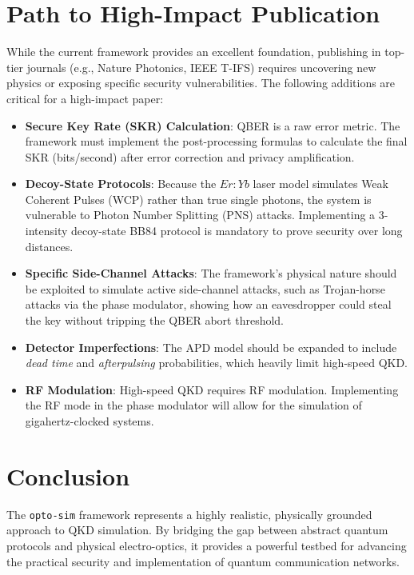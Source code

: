 \documentclass[12pt,a4paper]{article}
\begin{document}
\section{Path to High-Impact Publication}
While the current framework provides an excellent foundation, publishing in top-tier journals (e.g., Nature Photonics, IEEE T-IFS) requires uncovering new physics or exposing specific security vulnerabilities. The following additions are critical for a high-impact paper:
\begin{itemize}
    \item \textbf{Secure Key Rate (SKR) Calculation}: QBER is a raw error metric. The framework must implement the post-processing formulas to calculate the final SKR (bits/second) after error correction and privacy amplification.
    \item \textbf{Decoy-State Protocols}: Because the $Er:Yb$ laser model simulates Weak Coherent Pulses (WCP) rather than true single photons, the system is vulnerable to Photon Number Splitting (PNS) attacks. Implementing a 3-intensity decoy-state BB84 protocol is mandatory to prove security over long distances.
    \item \textbf{Specific Side-Channel Attacks}: The framework's physical nature should be exploited to simulate active side-channel attacks, such as Trojan-horse attacks via the phase modulator, showing how an eavesdropper could steal the key without tripping the QBER abort threshold.
    \item \textbf{Detector Imperfections}: The APD model should be expanded to include \textit{dead time} and \textit{afterpulsing} probabilities, which heavily limit high-speed QKD.
    \item \textbf{RF Modulation}: High-speed QKD requires RF modulation. Implementing the RF mode in the phase modulator will allow for the simulation of gigahertz-clocked systems.
\end{itemize}

\section{Conclusion}
The \texttt{opto-sim} framework represents a highly realistic, physically grounded approach to QKD simulation. By bridging the gap between abstract quantum protocols and physical electro-optics, it provides a powerful testbed for advancing the practical security and implementation of quantum communication networks.
\end{document}
